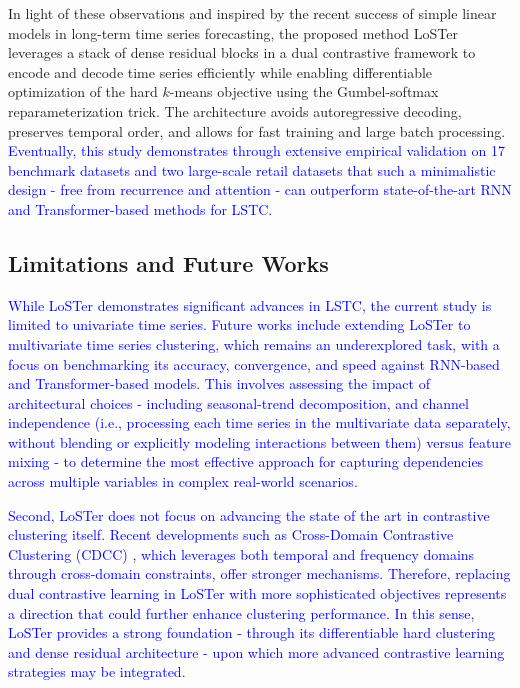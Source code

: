 \documentclass[times, review, 10pt]{elsarticle}
\begin{document}
In light of these observations and inspired by the recent success of simple linear models in long-term time series forecasting, the proposed method LoSTer leverages a stack of dense residual blocks in a dual contrastive framework to encode and decode time series efficiently while enabling differentiable optimization of the hard $k$-means objective using the Gumbel-softmax reparameterization trick. The architecture avoids autoregressive decoding, preserves temporal order, and allows for fast training and large batch processing. \textcolor{blue}{Eventually, this study demonstrates through extensive empirical validation on 17 benchmark datasets and two large-scale retail datasets that such a minimalistic design - free from recurrence and attention - can outperform state-of-the-art RNN and Transformer-based methods for LSTC.}

\subsection{Limitations and Future Works}
\textcolor{blue}{While LoSTer demonstrates significant advances in LSTC, the current study is limited to univariate time series. Future works include extending LoSTer to multivariate time series clustering, which remains an underexplored task, with a focus on benchmarking its accuracy, convergence, and speed against RNN-based and Transformer-based models. This involves assessing the impact of architectural choices - including seasonal-trend decomposition, and channel independence (i.e., processing each time series in the multivariate data separately, without blending or explicitly modeling interactions between them) versus feature mixing - to determine the most effective approach for capturing dependencies across multiple variables in complex real-world scenarios.}

\textcolor{blue}{Second, LoSTer does not focus on advancing the state of the art in contrastive clustering itself. Recent developments such as Cross-Domain Contrastive Clustering (CDCC) \cite{peng2024cross}, which leverages both temporal and frequency domains through cross-domain constraints, offer stronger mechanisms. Therefore, replacing dual contrastive learning in LoSTer with more sophisticated objectives represents a direction that could further enhance clustering performance. In this sense, LoSTer provides a strong foundation - through its differentiable hard clustering and dense residual architecture - upon which more advanced contrastive learning strategies may be integrated.}
\end{document}
